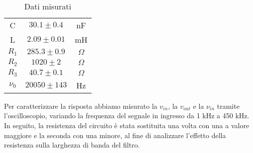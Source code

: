 \documentclass[9pt,a4paper,twocolumn,twoside]{tau-class/tau}
\begin{document}
\begin{table}[h!]
    \centering
    \begin{tabular}{c c c}
    \hline
    C & $30.1 \pm 0.4$ & nF \\
    L & $2.09 \pm 0.01$ & mH \\
    $R_1$& $285.3 \pm 0.9$ & $\Omega$ \\
    $R_2$& $1020 \pm 2$ & $\Omega$ \\
    $R_3$& $40.7 \pm 0.1$ & $\Omega$ \\
    $\nu_0$& $20050 \pm 143$ & Hz \\
    \hline
\end{tabular}
\caption{Dati misurati}
\end{table}
Per caratterizzare la risposta abbiamo misurato la $v_{in}$, la $v_{out}$ e la $\nu_{in}$ tramite l'oscilloscopio, variando la frequenza del segnale in ingresso da 1 kHz a 450 kHz.\\
In seguito, la resistenza del circuito è stata sostituita una volta con una a valore maggiore e la seconda con una minore, al fine di analizzare l'effetto della resistenza sulla larghezza di banda del filtro.
	\vspace{-0.2cm}	
\end{document}
